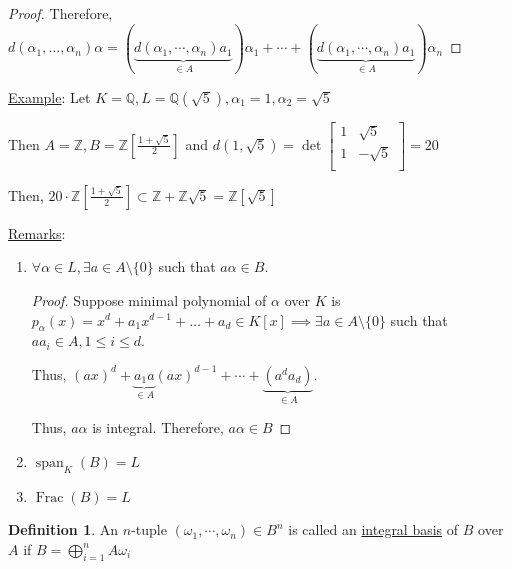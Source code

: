 \documentclass[openany]{amsbook}
\numberwithin{section}{chapter}
\theoremstyle{definition}
\newtheorem*{definition}{Definition}
\newcommand{\Frac}{\operatorname{Frac}}
\begin{document}
\begin{proof}
   Therefore, \(d(\alpha_1, \dots , \alpha_n)\alpha  = (\underbrace{d(\alpha_1, \cdots , \alpha_n) a_1}_{\in A}) \alpha_1 + \cdots + (\underbrace{d(\alpha_1, \cdots , \alpha_n) a_1}_{\in A})\alpha_n\) 

\end{proof}

\underline{Example}: Let \(K = \mathbb{Q} , L = \mathbb{Q}(\sqrt{5}), \alpha_1 = 1, \alpha_2 = \sqrt{5}\)

Then \(A = \mathbb{Z} , B = \mathbb{Z} \left[ \frac{1+\sqrt{5}}{2} \right] \) and \(d(1, \sqrt{5}) = \det \begin{bmatrix}
    1 &  \sqrt{5} \\
    1 &  -\sqrt{5} \\
\end{bmatrix} = 20\) 

Then, \(20 \cdot \mathbb{Z} \left[ \frac{1+\sqrt{5}}{2} \right] \subset \mathbb{Z} + \mathbb{Z} \sqrt{5} = \mathbb{Z} [\sqrt{5}] \) 

\underline{Remarks}:

\begin{enumerate}[label=\arabic*)] 

\item \(\forall \alpha \in L, \exists a \in A \setminus \{ 0 \}\) such that \(a \alpha \in B\).

\begin{proof}
    Suppose minimal polynomial of \(\alpha \) over \(K\) is \(p_\alpha (x) = x^d + a_1 x^{d-1} + \dots + a_d \in K[x] \implies \exists a \in A \setminus \{ 0 \} \) such that \(a a_i \in A, 1 \leq i \leq d\).

    Thus, \((ax)^d + \underbrace{a_1 a}_{\in A}(ax)^{d-1} + \cdots + \underbrace{(a^d a_d)}_{\in A}\).

    Thus, \(a \alpha\) is integral. Therefore, \(a \alpha \in B\)
\end{proof}

    \item \(\operatorname{span}_K(B) = L \)
    \item \(\Frac(B) = L\)  

\end{enumerate}

\begin{definition}
    An \(n\)-tuple \((\omega_1, \cdots, \omega_n)\in B^n\) is called an \underline{integral basis} of \(B\) over \(A\) if \(B = \bigoplus_{i=1}^n A \omega_i\)
\end{definition}
\end{document}
